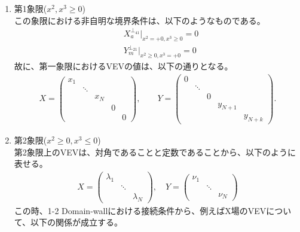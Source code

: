 \documentclass[dvipdfmx,a4paper,10.5pt]{article}
\numberwithin{equation}{section}
\begin{document}
\begin{enumerate}
    \item 第1象限($x^{2},x^{3}\geq0$)\\
    この象限における非自明な境界条件は、以下のようなものである。
    \begin{align*}
        &X_{a}^{\perp_{41}}|_{x^{2}=+0,x^{3}\geq 0}=0\\
        &Y_{m}^{\perp_{21}}|_{x^{2}\geq 0,x^{3}=+0}=0
    \end{align*}
    故に、第一象限におけるVEVの値は、以下の通りとなる。
    \begin{align*}
X=
\begin{pmatrix}
x_1 &        &        &        &  \\
    & \ddots &        &        &   \\
    &        & x_N    &        &   \\
    &        &        & 0      &   \\
   &        &        &        & 0
\end{pmatrix},
\qquad
Y=
\begin{pmatrix}
0   &        &        &        &  \\
    & \ddots &        &        &   \\
    &        & 0      &        &   \\
    &        &        & y_{N+1}&   \\
    &        &        &        & y_{N+k}
\end{pmatrix}.
    \end{align*}
    \item 第2象限($x^{2}\geq0,x^{3}\leq0$)\\
    第2象限上のVEVは、対角であることと定数であることから、以下のように表せる。
    \begin{align*}
        X=\begin{pmatrix}
\lambda_1 &        &          \\
    & \ddots &          \\
    &        & \lambda_N    
        \end{pmatrix}
        ,\quad
        Y=\begin{pmatrix}
\nu_1 &        &          \\
    & \ddots &          \\
    &        & \nu_N
        \end{pmatrix}
    \end{align*}
この時、1-2 Domain-wallにおける接続条件から、例えばX場のVEVについて、以下の関係が成立する。

\end{enumerate}
\end{document}
